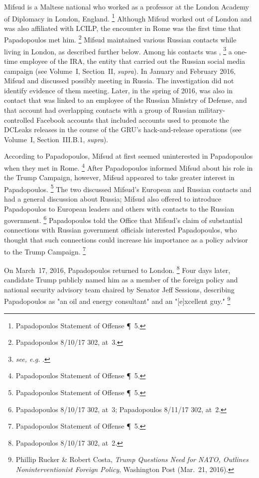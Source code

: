 Mifsud is a Maltese national who worked as a professor at the London Academy of Diplomacy in London, England.%
\footnote{Papadopoulos Statement of Offense \P~5.}
Although Mifsud worked out of London and was also affiliated with LCILP, the encounter in Rome was the first time that Papadopoulos met him.%
\footnote{Papadopoulos 8/10/17 302, at~3.}
Mifsud maintained various Russian contacts while living in London, as described further below.
Among his contacts was ,%
\footnote{\textit{see, e.g.} .
}
a one-time employee of the IRA, the entity that carried out the Russian social media campaign (see Volume~I, Section~II, \textit{supra}).
In January and February 2016, Mifsud and  discussed  possibly meeting in Russia.
The investigation did not identify evidence of them meeting.
Later, in the spring of 2016,  was also in contact  that was linked to an employee of the Russian Ministry of Defense, and that account had overlapping contacts with a group of Russian military-controlled Facebook accounts that included accounts used to promote the DCLeaks releases in the course of the GRU's hack-and-release operations (see Volume~I, Section~III.B.1, \textit{supra}).

According to Papadopoulos, Mifsud at first seemed uninterested in Papadopoulos when they met in Rome.%
\footnote{Papadopoulos Statement of Offense \P~5.}
After Papadopoulos informed Mifsud about his role in the Trump Campaign, however, Mifsud appeared to take greater interest in Papadopoulos.%
\footnote{Papadopoulos Statement of Offense \P~5.}
The two discussed Mifsud's European and Russian contacts and had a general discussion about Russia; Mifsud also offered to introduce Papadopoulos to European leaders and others with contacts to the Russian government.%
\footnote{Papadopoulos 8/10/17 302, at~3; Papadopoulos 8/11/17 302, at~2.}
Papadopoulos told the Office that Mifsud's claim of substantial connections with Russian government officials interested Papadopoulos, who thought that such connections could increase his importance as a policy advisor to the Trump Campaign.%
\footnote{Papadopoulos Statement of Offense \P~5.}

On March~17, 2016, Papadopoulos returned to London.%
\footnote{Papadopoulos 8/10/17 302, at~2.}
Four days later, candidate Trump publicly named him as a member of the foreign policy and national security advisory team chaired by Senator Jeff Sessions, describing Papadopoulos as "an oil and energy consultant" and an "[e]xcellent guy."%
\footnote{Phillip Rucker \& Robert Costa, \textit{Trump Questions Need for NATO, Outlines Noninterventionist Foreign Policy}, Washington Post (Mar.~21, 2016).}

